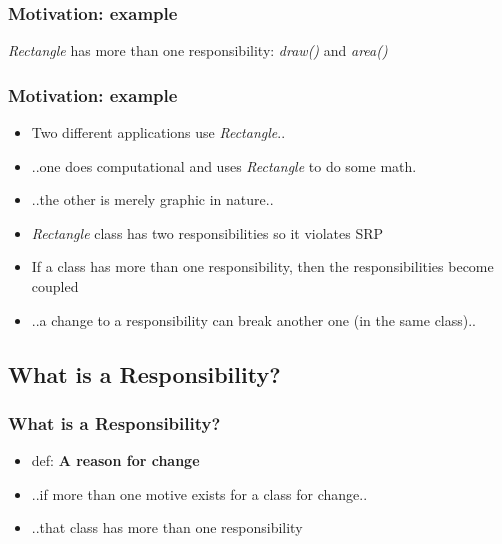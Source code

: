 \documentclass{beamer}
\begin{document}
\begin{frame}
  \frametitle{Motivation: example}
    \textit{Rectangle} has more than one responsibility: \textit{draw()} and \textit{area()} \\
    \bigbreak
\end{frame}

\begin{frame}
  \frametitle{Motivation: example}
  \begin{itemize}
	\item<+-> Two different applications use \textit{Rectangle}..
	\item<+-> ..one does computational and uses \textit{Rectangle} to do some math. 
	\item<+-> ..the other is merely graphic in nature..
	\item<+-> \textit{Rectangle} class has two responsibilities so it violates SRP
	\item<+-> If a class has more than one responsibility, then the responsibilities become coupled
	\item<+-> ..a change to a responsibility can break another one (in the same class).. 
   \end{itemize}
\end{frame}

\subsection{What is a Responsibility?}
\begin{frame}
  \frametitle{What is a Responsibility?}
  \begin{itemize}
	\item<+-> def: \textbf{A reason for change}
	\item<+-> ..if more than one motive exists for a class for change.. 
	\item<+-> ..that class has more than one responsibility
   \end{itemize}
\end{frame}
\end{document}
